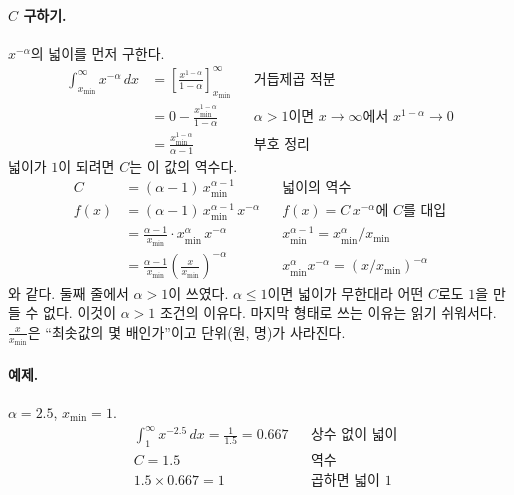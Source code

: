 \documentclass[11pt]{article}
\begin{document}
\paragraph{$C$ 구하기.} $x^{-\alpha}$의 넓이를 먼저 구한다.
\begin{align*}
  \int_{x_{\min}}^{\infty} x^{-\alpha}\,dx
    &= \left[\frac{x^{1-\alpha}}{1-\alpha}\right]_{x_{\min}}^{\infty}
    && \text{거듭제곱 적분}\\
    &= 0 - \frac{x_{\min}^{1-\alpha}}{1-\alpha}
    && \text{$\alpha > 1$이면 $x \to \infty$에서 $x^{1-\alpha} \to 0$}\\
    &= \frac{x_{\min}^{1-\alpha}}{\alpha-1}
    && \text{부호 정리}
\end{align*}
넓이가 $1$이 되려면 $C$는 이 값의 역수다.
\begin{align*}
  C &= (\alpha-1)\,x_{\min}^{\alpha-1}
    && \text{넓이의 역수}\\
  f(x) &= (\alpha-1)\,x_{\min}^{\alpha-1}\,x^{-\alpha}
    && \text{$f(x) = C\,x^{-\alpha}$에 $C$를 대입}\\
       &= \frac{\alpha-1}{x_{\min}} \cdot x_{\min}^{\alpha}\,x^{-\alpha}
    && \text{$x_{\min}^{\alpha-1} = x_{\min}^{\alpha}/x_{\min}$}\\
       &= \frac{\alpha-1}{x_{\min}} \left(\frac{x}{x_{\min}}\right)^{-\alpha}
    && \text{$x_{\min}^{\alpha}x^{-\alpha} = (x/x_{\min})^{-\alpha}$}
\end{align*}
와 같다. 둘째 줄에서 $\alpha > 1$이 쓰였다. $\alpha \le 1$이면 넓이가
무한대라 어떤 $C$로도 $1$을 만들 수 없다. 이것이 $\alpha > 1$ 조건의 이유다.
마지막 형태로 쓰는 이유는 읽기 쉬워서다. $\frac{x}{x_{\min}}$은 ``최솟값의 몇 배인가''이고
단위(원, 명)가 사라진다.

\paragraph{예제.} $\alpha = 2.5$, $x_{\min} = 1$.
\begin{align*}
  &\int_1^{\infty} x^{-2.5}\,dx = \frac{1}{1.5} = 0.667 && \text{상수 없이 넓이}\\
  &C = 1.5                                             && \text{역수}\\
  &1.5 \times 0.667 = 1                                && \text{곱하면 넓이 $1$}
\end{align*}
\end{document}
